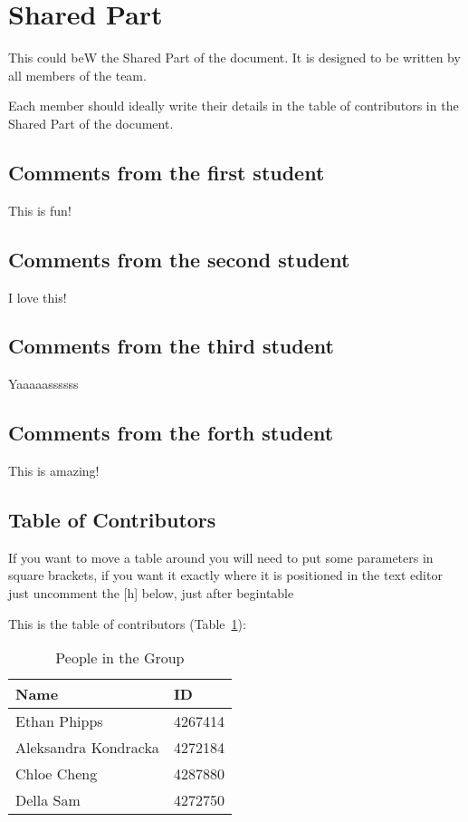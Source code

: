 \section{Shared Part}

This could beW the Shared Part of the document. It is designed to be written by all members of the team.

Each member should ideally write their details in the table of contributors in the Shared Part of the document.

\subsection{Comments from the first student}
This is fun!

\subsection{Comments from the second student}
I love this!

\subsection{Comments from the third student}
Yaaaaassssss

\subsection{Comments from the forth student}
This is amazing!

\subsection{Table of Contributors}


If you want to move a table around you will need to put some parameters in square brackets, if you want it exactly where it is positioned in the text editor just uncomment the [h] below, just after begin{table}

This is the table of contributors (Table~\ref{authors}):
\begin{table}%
\centering
\caption{People in the Group}
\label{authors}
\begin{tabular}{|l|l|}
\hline
\textbf{Name} & \textbf{ID} \\
\hline
Ethan Phipps & 4267414\\
\hline
Aleksandra Kondracka & 4272184\\
\hline
Chloe Cheng & 4287880 \\
\hline
Della Sam & 4272750 \\
\hline
\end{tabular}
\end{table}